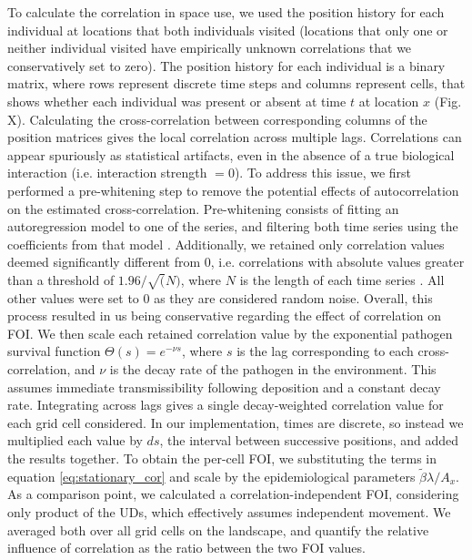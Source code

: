 \documentclass[letterpaper]{article}
\begin{document}
To calculate the correlation in space use, we used the position history for each individual at locations that both individuals visited (locations that only one or neither individual visited have empirically unknown correlations that we conservatively set to zero). The position history for each individual is a binary matrix, where rows represent discrete time steps and columns represent cells, that shows whether each individual was present or absent at time $t$ at location $x$ (Fig. X). Calculating the cross-correlation between corresponding columns of the position matrices gives the local correlation across multiple lags. %
Correlations can appear spuriously as statistical artifacts, even in the absence of a true biological interaction (i.e. interaction strength $=0$). To address this issue, we first performed a pre-whitening step to remove the potential effects of autocorrelation on the estimated cross-correlation. Pre-whitening consists of fitting an autoregression model to one of the series, and filtering both time series using the coefficients from that model \citep{Dean2016}. Additionally, we retained only correlation values deemed significantly different from 0, i.e. correlations with absolute values greater than a threshold of $1.96/\sqrt(N)$, where $N$ is the length of each time series \citep{Dean2016}. All other values were set to 0 as they are considered random noise. Overall, this process resulted in us being conservative regarding the effect of correlation on FOI.
We then scale each retained correlation value by the exponential pathogen survival function $\Theta(s) = e^{-\nu s}$, where $s$ is the lag corresponding to each cross-correlation, and $\nu$ is the decay rate of the pathogen in the environment. This assumes immediate transmissibility following deposition and a constant decay rate. Integrating across lags gives a single decay-weighted correlation value for each grid cell considered. In our implementation, times are discrete, so instead we multiplied each value by $ds$, the interval between successive positions, and added the results together. To obtain the per-cell FOI, we substituting the terms in equation \ref{eq:stationary_cor} and scale by the epidemiological parameters $\tilde\beta\lambda/ A_x$. As a comparison point, we calculated a correlation-independent FOI, considering only product of the UDs, which effectively assumes independent movement. We averaged both over all grid cells on the landscape, and quantify the relative influence of correlation as the ratio between the two FOI values. 
\end{document}
